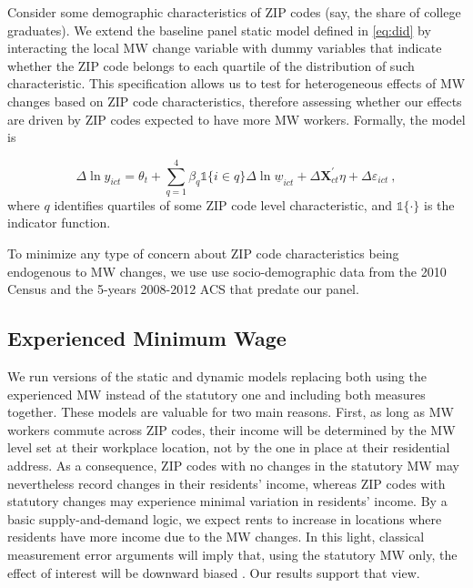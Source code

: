 Consider some demographic characteristics of ZIP codes (say, the share of college graduates).
We extend the baseline panel static model defined in \autoref{eq:did} by interacting the local 
MW change variable with dummy variables that indicate whether the ZIP code belongs to each 
quartile of the distribution of such characteristic. This specification allows us to test for 
heterogeneous effects of MW changes based on ZIP code characteristics, therefore assessing 
whether our effects are driven by ZIP codes expected to have more MW workers. Formally, the 
model is

\begin{equation}\label{eq:diff_main_hetero} 
    \Delta \ln y_{ict} = \theta_t
    				+ \sum_{q = 1}^4 \beta_q \mathds{1}\{i \in q\} \Delta \ln \underline{w}_{ict}
    				+ \Delta \mathbf{X}^{'}_{ct}\eta
    				+ \Delta \varepsilon_{ict} \ ,
\end{equation}
where $q$ identifies quartiles of some ZIP code level characteristic, and $\mathds{1}\{\cdot\}$ 
is the indicator function.

To minimize any type of concern about ZIP code characteristics being endogenous to MW changes, 
we use use socio-demographic data from the 2010 Census and the 5-years 2008-2012 ACS that 
predate our panel.


\subsection{Experienced Minimum Wage}\label{sec:emp_strategy_expmw}

We run versions of the static and dynamic models replacing both using the experienced MW instead 
of the statutory one and including both measures together. These models are valuable for two main 
reasons. First, as long as MW workers commute across ZIP codes, their income will be determined 
by the MW level set at their workplace location, not by the one in place at their residential 
address. As a consequence, ZIP codes with no changes in the statutory MW may nevertheless record 
changes in their residents' income, whereas ZIP codes with statutory changes may experience minimal 
variation in residents' income. By a basic supply-and-demand logic, we expect rents to increase in 
locations where residents have more income due to the MW changes. In this light, classical 
measurement error arguments will imply that, using the statutory MW only, the effect of interest 
will be downward biased \parencite{AngristPischke2009}. Our results support that view. 

